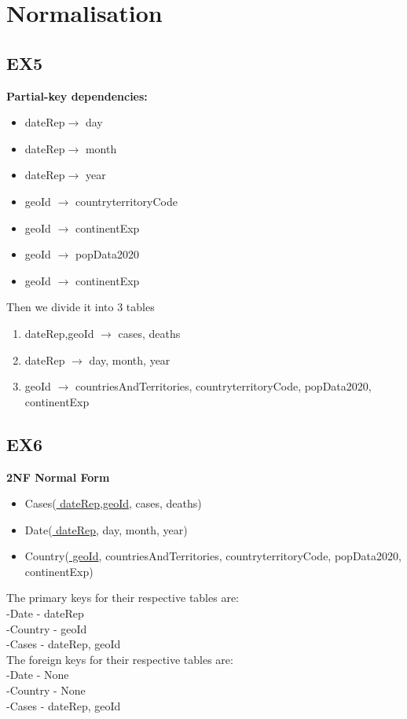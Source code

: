 \documentclass[]{article}
\begin{document}
\newpage
\section{Normalisation}
\subsection{EX5}
\textbf{ Partial-key dependencies: }
\begin{itemize}
    \item dateRep$\to$ day
    \item dateRep$\to$ month
    \item dateRep$\to$ year
    \item geoId $\to$ countryterritoryCode
    \item geoId $\to$ continentExp
    \item geoId $\to$ popData2020
    \item geoId $\to$ continentExp
\end{itemize}
Then we divide it into 3 tables
\begin{enumerate}
    \item dateRep,geoId $\to$ cases, deaths
    \item dateRep $\to$ day, month, year
    \item geoId $\to$ countriesAndTerritories, countryterritoryCode, popData2020, continentExp
\end{enumerate}

\subsection{EX6}
\textbf{2NF Normal Form}
\begin{itemize}
    \item Cases(\underline{ dateRep,geoId}, cases, deaths)
    \item Date(\underline{ dateRep}, day, month, year)
    \item Country(\underline{ geoId}, countriesAndTerritories, countryterritoryCode, popData2020, continentExp)
\end{itemize}
The primary keys for their respective tables are:\\
-Date - dateRep \\
-Country - geoId \\
-Cases - dateRep, geoId \\

The foreign keys for their respective tables are:\\
-Date - None \\
-Country - None    \\
-Cases - dateRep, geoId   \\
\end{document}
